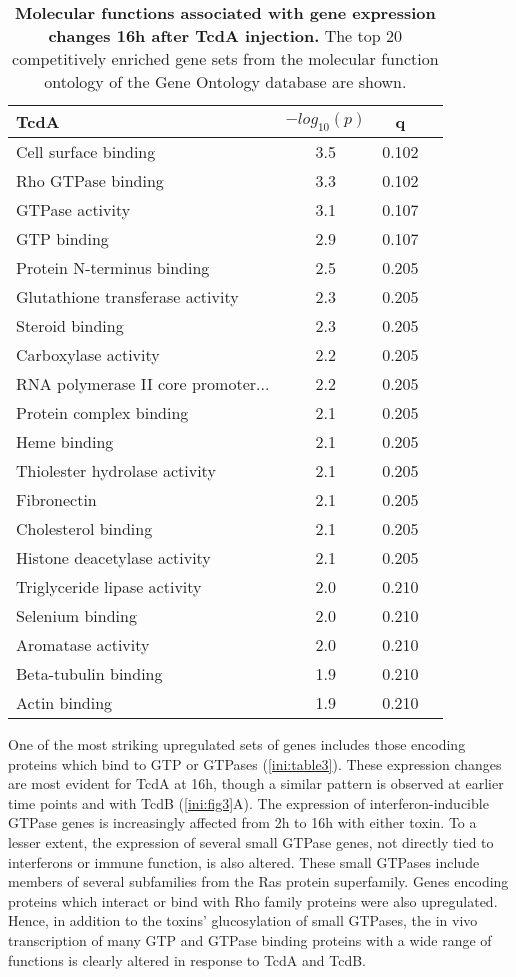 \begin{table}
\begin{center}
\begin{tabular}{ l c c c }
TcdA & $-log_{10}(p)$ & q \\ \hline
Cell surface binding & 3.5 & 0.102 \\
Rho GTPase binding & 3.3 & 0.102 \\
GTPase activity & 3.1 & 0.107 \\
GTP binding & 2.9 & 0.107 \\
Protein N-terminus binding & 2.5 & 0.205 \\
Glutathione transferase activity & 2.3 & 0.205 \\
Steroid binding & 2.3 & 0.205 \\
Carboxylase activity & 2.2 & 0.205 \\
RNA polymerase II core promoter... & 2.2 & 0.205 \\
Protein complex binding & 2.1 & 0.205 \\
Heme binding & 2.1 & 0.205 \\
Thiolester hydrolase activity & 2.1 & 0.205 \\
Fibronectin & 2.1 & 0.205 \\
Cholesterol binding & 2.1 & 0.205 \\
Histone deacetylase activity & 2.1 & 0.205 \\
Triglyceride lipase activity & 2.0 & 0.210 \\
Selenium binding & 2.0 & 0.210 \\
Aromatase activity & 2.0 & 0.210 \\
Beta-tubulin binding & 1.9 & 0.210 \\
Actin binding & 1.9 & 0.210 \\
\end{tabular}
\caption[Molecular functions associated with gene expression changes 16h after TcdA injection]{
 \textbf{Molecular functions associated with gene expression changes 16h after TcdA injection.}
The top 20 competitively enriched gene sets from the molecular 
function ontology of the Gene Ontology database are shown.}
\label{ini:table3}
\end{center}
\end{table}



One of the most striking upregulated sets of genes includes those 
encoding proteins which bind to GTP or GTPases (\autoref{ini:table3}). 
These expression changes are most evident for TcdA at 16h, though a 
similar pattern is observed at earlier time points and with TcdB 
(\autoref{ini:fig3}A). The expression of interferon-inducible GTPase 
genes is increasingly affected from 2h to 16h with either toxin. To a 
lesser extent, the expression of several small GTPase genes, not 
directly tied to interferons or immune function, is also altered. These 
small GTPases include members of several subfamilies from the Ras protein 
superfamily. Genes encoding proteins which interact or bind with Rho 
family proteins were also upregulated. Hence, in addition to the 
toxins' glucosylation of small GTPases, the in vivo transcription of 
many GTP and GTPase binding proteins with a wide range of functions 
is clearly altered in response to TcdA and TcdB.

